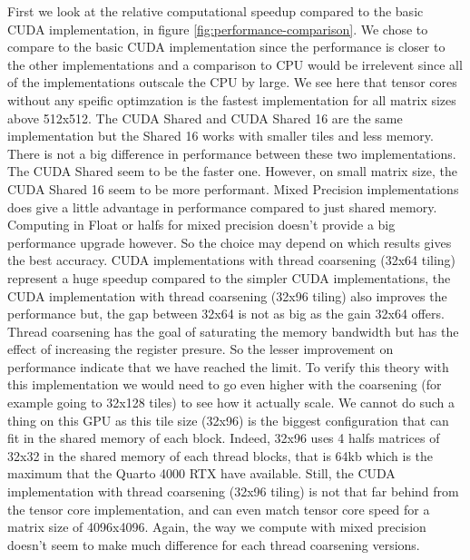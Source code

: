 \documentclass[conference]{IEEEtran}
\begin{document}
  First we look at the relative computational speedup compared to the basic CUDA implementation, in figure \ref{fig:performance-comparison}.
  We chose to compare to the basic CUDA implementation since the performance is closer to 
  the other implementations and a comparison to CPU would be irrelevent since all of the implementations
  outscale the CPU by large. 
  We see here that tensor cores without any speific optimzation is the fastest implementation for all matrix sizes above 512x512.
  The CUDA Shared and CUDA Shared 16 are the same implementation but the Shared 16 works with smaller tiles and less 
  memory. There is not a big difference in performance between these two implementations. The CUDA Shared seem to be the faster one. However,
  on small matrix size, the CUDA Shared 16 seem to be more performant.
  Mixed Precision implementations does give a little advantage in performance compared to just shared memory.
  Computing in Float or halfs for mixed precision doesn't provide a big performance upgrade however. So the choice may depend on which results
  gives the best accuracy.
  CUDA implementations with thread coarsening (32x64 tiling) represent a huge
  speedup compared to the simpler CUDA implementations, the CUDA implementation with thread coarsening (32x96 tiling) also improves
  the performance but, the gap between 32x64 is not as big as the gain 32x64 offers. Thread coarsening has the goal
  of saturating the memory bandwidth but has the effect of increasing the register presure. So the lesser improvement on performance
  indicate that we have reached the limit.
  To verify this theory with this implementation we would need to go even higher with the coarsening (for example going to 32x128 tiles) to see how it actually scale.
  We cannot do such a thing on this GPU as this tile size (32x96) is the biggest configuration that can fit in the shared memory of each block.
  Indeed, 32x96 uses 4 halfs matrices of 32x32 in the shared memory of each thread blocks, that is 64kb which is the maximum that the Quarto 4000 RTX have available.
  Still, the CUDA implementation with thread coarsening (32x96 tiling) is not that far behind from the tensor core implementation, and can even match 
  tensor core speed for a matrix size of 4096x4096.
  Again, the way we compute with mixed precision doesn't seem to make much difference for each thread coarsening versions.

  
\end{document}
